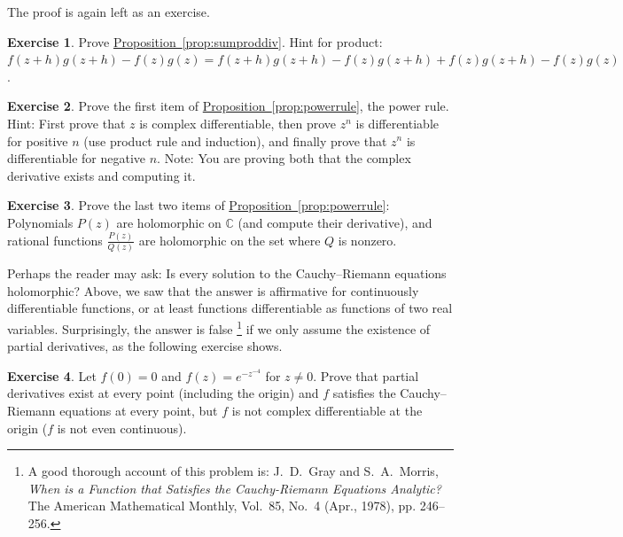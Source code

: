 \documentclass[12pt,openany]{book}
\newcommand{\C}{{\mathbb{C}}}
\theoremstyle{plain}
\theoremstyle{remark}
\theoremstyle{definition}
\newenvironment{exbox}{%
    \def\FrameCommand{\vrule width 1pt \relax\hspace{10pt}}%
    \MakeFramed{\advance\hsize-\width\FrameRestore}%
}{%
    \endMakeFramed
}
\theoremstyle{exercise}
\newtheorem{exercise}{Exercise}[section]
\theoremstyle{example}
\newcommand{\propref}[1]{\hyperref[#1]{Proposition~\ref*{#1}}}
\begin{document}
The proof is again left as an exercise.

\begin{exbox}
\begin{exercise}
Prove \propref{prop:sumproddiv}.
Hint for product: 
$f(z+h)g(z+h) - f(z)g(z) =
f(z+h)g(z+h) - f(z)g(z+h) +
f(z)g(z+h) - f(z)g(z)$.
\end{exercise}

\begin{exercise}
Prove the first item of \propref{prop:powerrule}, the power rule.
Hint: First prove that $z$ is complex differentiable,
then prove $z^n$ is differentiable for positive $n$ (use product rule and
induction), and finally prove
that $z^n$ is differentiable for negative $n$.
Note: You are proving both that the complex derivative exists and
computing it.
\end{exercise}

\begin{exercise}
Prove the last two items of \propref{prop:powerrule}:
Polynomials $P(z)$ are holomorphic on $\C$ (and compute their derivative),
and rational functions
$\frac{P(z)}{Q(z)}$ are holomorphic on the set where $Q$ is nonzero.
\end{exercise}
\end{exbox}

Perhaps the reader may ask:
Is every solution to
the Cauchy--Riemann equations holomorphic?  Above, we saw that the answer
is affirmative for continuously differentiable functions, or at least
functions differentiable as functions of two real variables.
Surprisingly, the answer is false%
\footnote{%
A good thorough account of this problem is:
J.\ D.\ Gray and  S.\ A.\ Morris,
\emph{When is a Function that Satisfies the Cauchy-Riemann Equations
Analytic?}  The American Mathematical Monthly, Vol.\ 85, No.\ 4 (Apr.,
1978), pp. 246--256.} if we only assume the existence of partial derivatives,
as the following exercise shows.

\begin{exbox}
\begin{exercise} \label{exercise:nonholCRsol}
Let $f(0) = 0$ and $f(z) = e^{-z^{-4}}$ for $z \not=0$.  Prove that partial
derivatives exist at every point (including the origin) and $f$
satisfies the Cauchy--Riemann equations at every point,
but $f$ is not complex differentiable at the origin ($f$ is not
even continuous).
\end{exercise}
\end{exbox}
\end{document}
